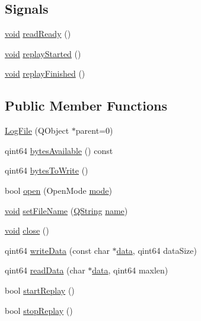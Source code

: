 \subsection*{Signals}
\begin{DoxyCompactItemize}
\item 
\hyperlink{group___u_a_v_objects_plugin_ga444cf2ff3f0ecbe028adce838d373f5c}{void} \hyperlink{class_log_file_a85878eac521376c7251e56fb9fd3a8ea}{read\-Ready} ()
\item 
\hyperlink{group___u_a_v_objects_plugin_ga444cf2ff3f0ecbe028adce838d373f5c}{void} \hyperlink{class_log_file_ac5942e468655732a7b3e6d0492c978b8}{replay\-Started} ()
\item 
\hyperlink{group___u_a_v_objects_plugin_ga444cf2ff3f0ecbe028adce838d373f5c}{void} \hyperlink{class_log_file_a2ec76a32cecae257dda0682cab448572}{replay\-Finished} ()
\end{DoxyCompactItemize}
\subsection*{Public Member Functions}
\begin{DoxyCompactItemize}
\item 
\hyperlink{class_log_file_a7a1cbbcbd9207aff498200f43afc000b}{Log\-File} (Q\-Object $\ast$parent=0)
\item 
qint64 \hyperlink{class_log_file_a9b005cee5c39390f3bfd483169dd61fa}{bytes\-Available} () const 
\item 
qint64 \hyperlink{class_log_file_afcd2cad8d846a73b1f4a82115d7eacd4}{bytes\-To\-Write} ()
\item 
bool \hyperlink{class_log_file_ad517c5a30953ceec11b5eac1d83d4d3d}{open} (Open\-Mode \hyperlink{glext_8h_a1e71d9c196e4683cc06c4b54d53f7ef5}{mode})
\item 
\hyperlink{group___u_a_v_objects_plugin_ga444cf2ff3f0ecbe028adce838d373f5c}{void} \hyperlink{class_log_file_a7e1213202ce1993e0bf6685f03abb392}{set\-File\-Name} (\hyperlink{group___u_a_v_objects_plugin_gab9d252f49c333c94a72f97ce3105a32d}{Q\-String} \hyperlink{glext_8h_ad977737dfc9a274a62741b9500c49a32}{name})
\item 
\hyperlink{group___u_a_v_objects_plugin_ga444cf2ff3f0ecbe028adce838d373f5c}{void} \hyperlink{class_log_file_a562305d5cd6f15bbebf4c0ad29fb553c}{close} ()
\item 
qint64 \hyperlink{class_log_file_aeb63c036d0151089ac2fd8a8ce1596d9}{write\-Data} (const char $\ast$\hyperlink{glext_8h_a8850df0785e6fbcc2351af3b686b8c7a}{data}, qint64 data\-Size)
\item 
qint64 \hyperlink{class_log_file_af7052808ae3c412bdcab996a8aca6b0a}{read\-Data} (char $\ast$\hyperlink{glext_8h_a8850df0785e6fbcc2351af3b686b8c7a}{data}, qint64 maxlen)
\item 
bool \hyperlink{class_log_file_a831f8e55896d31e6bedd805a0d429dbf}{start\-Replay} ()
\item 
bool \hyperlink{class_log_file_a642df666429251c89899ddccc03d7525}{stop\-Replay} ()
\end{DoxyCompactItemize}
